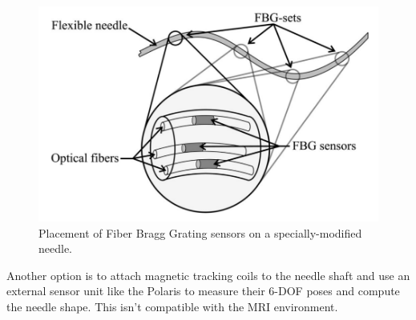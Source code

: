\begin{figure}[h]
\includegraphics[width=1.0\textwidth]{Fig/chap2/fbg_needle.png}
\caption{Placement of Fiber Bragg Grating sensors on a specially-modified needle\cite{roesthuis_three-dimensional_2014}.}
\label{fig:needle_fbg}
\end{figure}

Another option is to attach magnetic tracking coils to the needle shaft and use an external sensor unit like the Polaris to measure their 6-DOF poses and compute the needle shape.
\cite{patil_needle_2014,wang_real-time_2015} This isn’t compatible with the MRI environment.







